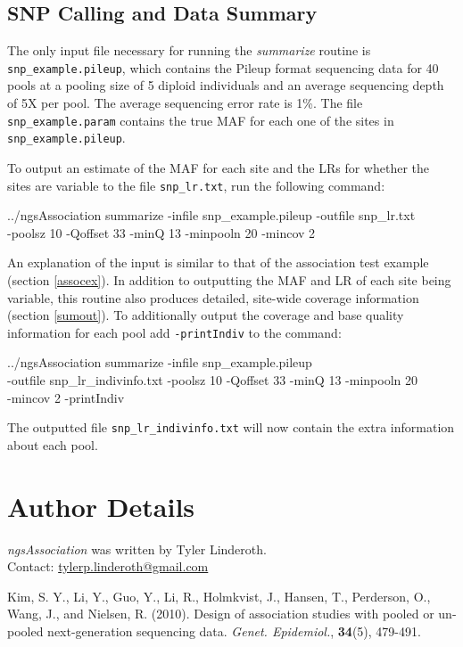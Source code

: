 \documentclass[12pt]{article}
\newenvironment{codeblock}{ \begin{framed}\ttfamily}{ \end{framed} }
\begin{document}
\subsection{SNP Calling and Data Summary}

The only input file necessary for running the \textit{summarize} routine is \texttt{snp\_example.pileup}, which contains the Pileup format sequencing data for 40 pools at a pooling size of 5 diploid individuals and an average sequencing depth of 5X per pool. The average sequencing error rate is 1\%. The file \texttt{snp\_example.param} contains the true MAF for each one of the sites in \texttt{snp\_example.pileup}.

\vspace{5mm}

To output an estimate of the MAF for each site and the LRs for whether the sites are variable to the file \texttt{snp\_lr.txt}, run the following command:

\begin{codeblock}
../ngsAssociation summarize -infile snp\_example.pileup -outfile snp\_lr.txt\\ -poolsz 10 -Qoffset 33 -minQ 13 -minpooln 20 -mincov 2
\end{codeblock}

An explanation of the input is similar to that of the association test example (section \ref{assocex}). In addition to outputting the MAF and LR of each site being variable, this routine also produces detailed, site-wide coverage information (section \ref{sumout}). To additionally output the coverage and base quality information for each pool add \texttt{-printIndiv} to the command:

 \begin{codeblock}
../ngsAssociation summarize -infile snp\_example.pileup\\ -outfile snp\_lr\_indivinfo.txt -poolsz 10 -Qoffset 33 -minQ 13 -minpooln 20\\ -mincov 2 -printIndiv
\end{codeblock}

The outputted file \texttt{snp\_lr\_indivinfo.txt} will now contain the extra information about each pool.

\section{Author Details}

\textit{ngsAssociation} was written by Tyler Linderoth.\\
Contact: \href{mailto:tylerp.linderoth@gmail.com}{tylerp.linderoth@gmail.com}

\begin{thebibliography}{2}

\addtolength{\leftmargin}{0.2in}
\setlength{\itemindent}{-0.2in}

 Kim, S. Y., Li, Y., Guo, Y., Li, R., Holmkvist, J., Hansen, T., Perderson, O., Wang, J., and Nielsen, R. (2010). Design of association studies with pooled or un-pooled next-generation sequencing data. \emph{Genet. Epidemiol.}, \textbf{34}(5), 479-491. 

\end{thebibliography}
\end{document}
